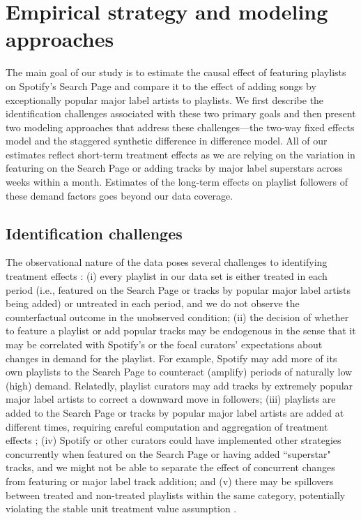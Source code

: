 \section{Empirical strategy and modeling approaches} \label{identification_strategy}

The main goal of our study is to estimate the causal effect of featuring playlists on Spotify's Search Page and compare it to the effect of adding songs by exceptionally popular major label artists to playlists. We first describe the identification challenges associated with these two primary goals and then present two modeling approaches that address these challenges---the two-way fixed effects model and the staggered synthetic difference in difference model. All of our estimates reflect short-term treatment effects as we are relying on the variation in featuring on the Search Page or adding tracks by major label superstars across weeks within a month. Estimates of the long-term effects on playlist followers of these demand factors goes beyond our data coverage.  

\subsection{Identification challenges}
\label{challenges_identification}

The observational nature of the data poses several challenges to identifying treatment effects \citep[e.g.,][]{berman2022value}: (i) every playlist in our data set is either treated in each period (i.e., featured on the Search Page or tracks by popular major label artists being added) or untreated in each period, and we do not observe the counterfactual outcome in the unobserved condition; (ii) the decision of whether to feature a playlist or add popular tracks may be endogenous in the sense that it may be correlated with Spotify's or the focal curators' expectations about changes in demand for the playlist. For example, Spotify may add more of its own playlists to the Search Page to
counteract (amplify) periods of naturally low (high) demand. Relatedly, playlist curators may add tracks by extremely popular major label artists to correct a downward move in followers; (iii) playlists are added to the Search Page or tracks by popular major label artists are added at different times, requiring careful computation and aggregation of treatment effects \citep[e.g., ][]{baker2022much}; %
(iv) Spotify or other curators could have implemented other strategies concurrently when featured on the Search Page or having added ``superstar" tracks, and we might not be able to separate the effect of concurrent changes from featuring or major label track addition; and (v) there may be spillovers between treated and non-treated playlists within the same category, potentially violating the stable unit treatment value assumption \citep[e.g.,][]{goldfarb2022conducting}.  


